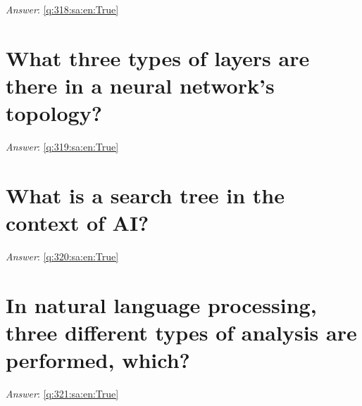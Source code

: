 \documentclass[a4paper,11pt,oneside]{book}
\begin{document}
\begin{sloppypar}
\label{q:318:sa:en:False}

\vspace{2cm}

\noindent\makebox[\textwidth]{\hrulefill}

\vspace{1cm}

\textit{Answer}: \autoref{q:318:sa:en:True}



\section{What three types of layers are there in a neural network's topology?}

\label{q:319:sa:en:False}

\vspace{2cm}

\noindent\makebox[\textwidth]{\hrulefill}

\vspace{1cm}

\textit{Answer}: \autoref{q:319:sa:en:True}



\section{What is a search tree in the context of AI?}

\label{q:320:sa:en:False}

\vspace{2cm}

\noindent\makebox[\textwidth]{\hrulefill}

\vspace{1cm}

\textit{Answer}: \autoref{q:320:sa:en:True}



\section{In natural language processing, three different types of analysis are performed, which?}

\label{q:321:sa:en:False}

\vspace{2cm}

\noindent\makebox[\textwidth]{\hrulefill}

\vspace{1cm}

\textit{Answer}: \autoref{q:321:sa:en:True}




\end{sloppypar}
\end{document}
